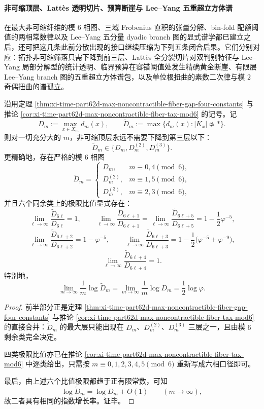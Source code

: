 \paragraph{非可缩顶层、Latt\`es 透明切片、预算断崖与 Lee--Yang 五重超立方体谱}
在最大非可缩纤维的模 \(6\) 相图、三域 Frobenius 直积的张量分解、bin-fold 配额阈值的两相常数律以及 Lee--Yang 五分量 dyadic branch 图的显式谱学都已建立之后，还可把这几条此前分散出现的接口继续压缩为下列五条闭合后果。它们分别对应：拓扑非可缩筛落只需下降到前三层、Latt\`es 全分裂切片对双判别特征与 Lee--Yang 局部分解型的统计透明、临界预算在容错阈值处发生精确黄金断崖、有限层 Lee--Yang branch 图的五重超立方体谱包，以及单位根扭曲的素数二次律与模 \(2\) 奇偶扭曲的谱孤立。

\begin{theorem}\label{thm:xi-time-part9zr-noncontractible-sixphase-law}
沿用定理 \ref{thm:xi-time-part62d-max-noncontractible-fiber-gap-four-constants} 与推论 \ref{cor:xi-time-part62d-max-noncontractible-fiber-tax-mod6} 的记号。记
\[
D_m:=\max_{x\in X_m} d_m(x),
\qquad
\widetilde D_m:=\max\{d_m(x): |K_x|\not\simeq *\}.
\]
则对一切充分大的 \(m\)，非可缩顶层永远不需要下降到第三层以下：
\[
\widetilde D_m\in \{D_m,D_m^{(2)},D_m^{(3)}\}.
\]
更精确地，存在严格的模 \(6\) 相图
\[
\widetilde D_m=
\begin{cases}
D_m, & m\equiv 0,4 \pmod 6,\\[2pt]
D_m^{(2)}, & m\equiv 1,5 \pmod 6,\\[2pt]
D_m^{(3)}, & m\equiv 2,3 \pmod 6,
\end{cases}
\]
并且六个同余类上的极限比值显式存在：
\[
\lim_{\ell\to\infty}\frac{\widetilde D_{6\ell}}{D_{6\ell}}=1,
\qquad
\lim_{\ell\to\infty}\frac{\widetilde D_{6\ell+1}}{D_{6\ell+1}}
=
\lim_{\ell\to\infty}\frac{\widetilde D_{6\ell+5}}{D_{6\ell+5}}
=
1-\frac{1}{2}\varphi^{-5},
\]
\[
\lim_{\ell\to\infty}\frac{\widetilde D_{6\ell+2}}{D_{6\ell+2}}
=
1-\varphi^{-5},
\qquad
\lim_{\ell\to\infty}\frac{\widetilde D_{6\ell+3}}{D_{6\ell+3}}
=
1-\frac{1}{2}\bigl(\varphi^{-5}+\varphi^{-9}\bigr),
\]
\[
\lim_{\ell\to\infty}\frac{\widetilde D_{6\ell+4}}{D_{6\ell+4}}=1.
\]
特别地，
\[
\lim_{m\to\infty}\frac{1}{m}\log \widetilde D_m
=
\lim_{m\to\infty}\frac{1}{m}\log D_m
=
\frac{1}{2}\log\varphi.
\]
\end{theorem}
\begin{proof}
前半部分正是定理 \ref{thm:xi-time-part62d-max-noncontractible-fiber-gap-four-constants} 与推论 \ref{cor:xi-time-part62d-max-noncontractible-fiber-tax-mod6} 的直接合并：\(\widetilde D_m\) 的最大层只能出现在 \(D_m\)、\(D_m^{(2)}\)、\(D_m^{(3)}\) 三层之一，且由模 \(6\) 剩余类完全决定。

四类极限比值亦已在推论 \ref{cor:xi-time-part62d-max-noncontractible-fiber-tax-mod6} 中逐类给出，只需按 \(m\equiv 0,1,2,3,4,5\pmod 6\) 重新写成六相口径即可。

最后，由上述六个比值极限都趋于正有限常数，可知
\[
\log \widetilde D_m=\log D_m+O(1)
\qquad (m\to\infty),
\]
故二者具有相同的指数增长率。证毕。
\end{proof}

